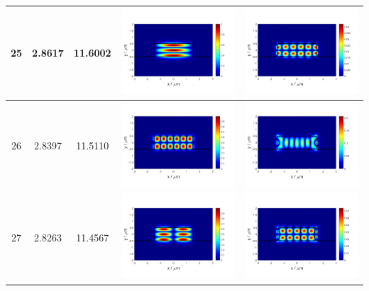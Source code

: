 \documentclass{assignment}
\begin{document}
\begin{sol}
\begin{itemize}
\begin{longtable}[c]{|c|c|c|c|c|}
            25 & 2.8617 & 11.6002 & \includegraphics[width=.3\columnwidth]{Assignment-2-mode-25-Ex.png} & \includegraphics[width=.3\columnwidth]{Assignment-2-mode-25-Ey.png} \\ \hline
            26 & 2.8397 & 11.5110 & \includegraphics[width=.3\columnwidth]{Assignment-2-mode-26-Ex.png} & \includegraphics[width=.3\columnwidth]{Assignment-2-mode-26-Ey.png} \\ \hline
            27 & 2.8263 & 11.4567 & \includegraphics[width=.3\columnwidth]{Assignment-2-mode-27-Ex.png} & \includegraphics[width=.3\columnwidth]{Assignment-2-mode-27-Ey.png} \\ \hline

\end{longtable}
\end{itemize}
\end{sol}
\end{document}
